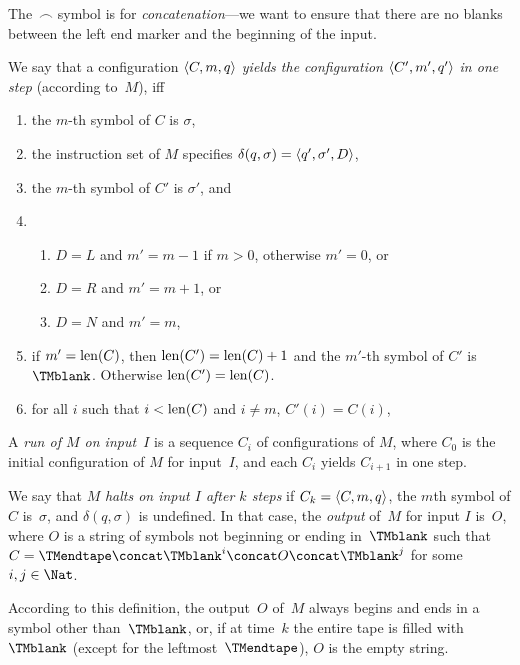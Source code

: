 \documentclass[../../../include/open-logic-section]{subfiles}
\begin{document}
\begin{explain}
The~$\frown$ symbol is for \emph{concatenation}---we want to
ensure that there are no blanks between the left end marker and
the beginning of the input.
\end{explain}

\begin{defn}
We say that a configuration $\langle C, m, q \rangle$ \emph{yields the
  configuration $\langle C', m', q' \rangle$ in one step} (according to~$M$),
  iff
\begin{enumerate}
\item the $m$-th symbol of $C$ is $\sigma$,
\item the instruction set of $M$ specifies $\delta(q, \sigma) =
  \langle q', \sigma', D \rangle$,
\item the $m$-th symbol of $C'$ is $\sigma'$, and 
\item
\begin{enumerate}
\item $D = L$ and $m' = m - 1$ if $m>0$, otherwise $m'=0$, or
\item $D = R$ and $m' = m + 1$, or
\item $D = N$ and $m' = m$,
\end{enumerate}
\item if $m' = \mathrm{len}(C)$, then $\mathrm{len}(C') = \mathrm{len}(C) + 1$ and the $m'$-th
  symbol of $C'$ is~$\TMblank$. Otherwise $\mathrm{len}(C')=\mathrm{len}(C)$.
\item for all $i$ such that $i < \mathrm{len}(C)$ and $i \neq m$, $C'(i) = C(i)$,
\end{enumerate}
\end{defn}

\begin{defn}
A \emph{run of $M$ on input~$I$} is a sequence $C_i$ of configurations
of $M$, where $C_0$ is the initial configuration of $M$ for input~$I$,
and each $C_i$ yields $C_{i+1}$ in one step.

We say that $M$ \emph{halts on input $I$ after $k$ steps} if $C_k =
\langle C, m, q \rangle$, the $m$th symbol of $C$ is~$\sigma$, and $\delta(q,
\sigma)$ is undefined.  In that case, the \emph{output} of~$M$ for
input $I$ is~$O$, where $O$ is a string of symbols not beginning or
ending in~$\TMblank$ such that $C = \TMendtape \concat \TMblank^i
\concat O \concat \TMblank^j$ for some~$i, j \in \Nat$.
\end{defn}

\begin{explain}
According to this definition, the output~$O$ of~$M$ always begins and
ends in a symbol other than~$\TMblank$, or, if at time~$k$ the entire
tape is filled with~$\TMblank$ (except for the leftmost~$\TMendtape$),
$O$ is the empty string.
\end{explain}
\end{document}
